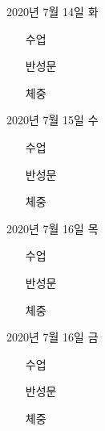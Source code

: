\documentclass[aspectratio=1610,17pt,xcolor=pdftex,dvipsnames,table,handout]{beamer}
\begin{document}
		\begin{frame} [t,plain]
			\begin{block} { 2020년 7월 14일 화 }

			\setlength{\leftmargini}{4em}			
			\begin{itemize}
				\item [수업] 
				\item [반성문] 
				\item [체중] 
			\end{itemize}
			\end{block}
		\end{frame}

		\begin{frame} [t,plain]
			\begin{block} { 2020년 7월 15일 수 }

			\setlength{\leftmargini}{4em}			
			\begin{itemize}
				\item [수업] 
				\item [반성문] 
				\item [체중] 
			\end{itemize}
			\end{block}
		\end{frame}

		\begin{frame} [t,plain]
			\begin{block} { 2020년 7월 16일 목 }

			\setlength{\leftmargini}{4em}			
			\begin{itemize}
				\item [수업] 
				\item [반성문] 
				\item [체중] 
			\end{itemize}
			\end{block}
		\end{frame}


		\begin{frame} [t,plain]
			\begin{block} { 2020년 7월 16일 금 }

			\setlength{\leftmargini}{4em}			
			\begin{itemize}
				\item [수업] 
				\item [반성문] 
				\item [체중] 
			\end{itemize}
			\end{block}
		\end{frame}
\end{document}

